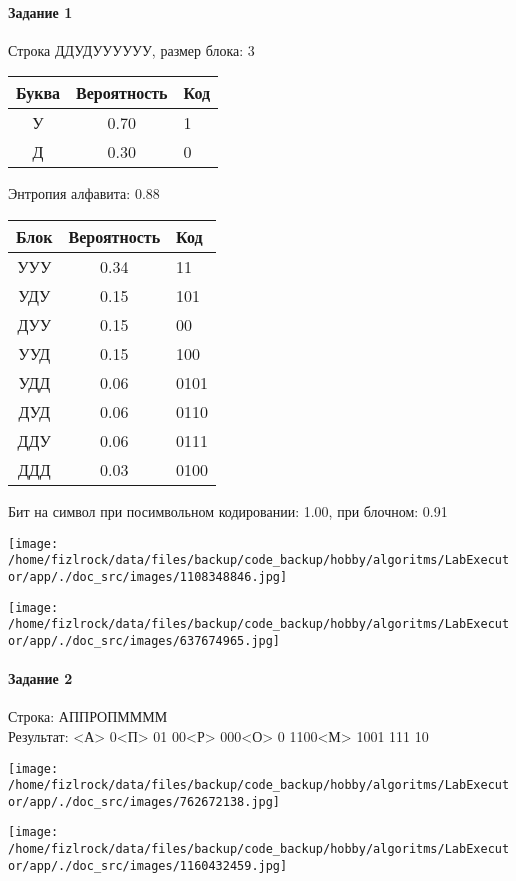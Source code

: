 \documentclass[a4paper, 12pt]{article}
\begin{document}
\paragraph{Задание 1}

Строка ДДУДУУУУУУ, размер блока: 3
\begin{center}
 \begin{tabular}{ |c|c|l| } 
  \hline
     Буква & Вероятность & Код\\ \hline
У & 0.70 & 1\\\hline
Д & 0.30 & 0
\\ \hline \end{tabular}
\end{center}
Энтропия алфавита: 0.88
\begin{center}
 \begin{tabular}{ |c|c|l| } 
  \hline
     Блок & Вероятность & Код\\ \hline
УУУ & 0.34 & 11\\\hline
УДУ & 0.15 & 101\\\hline
ДУУ & 0.15 & 00\\\hline
УУД & 0.15 & 100\\\hline
УДД & 0.06 & 0101\\\hline
ДУД & 0.06 & 0110\\\hline
ДДУ & 0.06 & 0111\\\hline
ДДД & 0.03 & 0100
\\ \hline \end{tabular}
\end{center}
Бит на символ при посимвольном кодировании: 1.00, при блочном: 0.91

\texttt{[image: /home/fizlrock/data/files/backup/code\_backup/hobby/algoritms/LabExecutor/app/./doc\_src/images/1108348846.jpg]}

\texttt{[image: /home/fizlrock/data/files/backup/code\_backup/hobby/algoritms/LabExecutor/app/./doc\_src/images/637674965.jpg]}
\pagebreak
\paragraph{Задание 2}

Строка: 
АППРОПММММ\\
Результат: <А> 0<П> 01 00<Р> 000<О> 0 1100<М> 1001 111 10

\texttt{[image: /home/fizlrock/data/files/backup/code\_backup/hobby/algoritms/LabExecutor/app/./doc\_src/images/762672138.jpg]}

\texttt{[image: /home/fizlrock/data/files/backup/code\_backup/hobby/algoritms/LabExecutor/app/./doc\_src/images/1160432459.jpg]}
\end{document}
